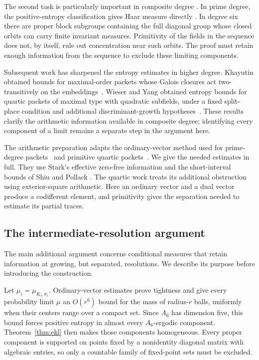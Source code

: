 The second task is particularly important in composite degree
\cite[Section~1.6.3]{ELMV2011}. In prime
degree, the positive-entropy classification gives Haar measure directly
\cite[Corollary~1.4]{EKL2006}. In degree six there are proper block
subgroups containing the full diagonal group whose closed orbits can
carry finite invariant measures. Primitivity of the fields in the
sequence does not, by itself, rule out concentration near such orbits.
The proof must retain enough information from the sequence to exclude
these limiting components.

Subsequent work has sharpened the entropy estimates in higher degree.
Khayutin obtained bounds for maximal-order packets whose Galois closures
act two-transitively on the embeddings~\cite[Theorem~1.1]{Khayutin2019}.
Wieser and Yang obtained entropy bounds for quartic packets of maximal
type with quadratic subfields, under a fixed split-place condition and
additional discriminant-growth hypotheses~\cite{WieserYang2026}.
These results clarify the arithmetic information available in composite
degree; identifying every component of a limit remains a separate step
in the argument here.

The arithmetic preparation adapts the ordinary-vector method used for
prime-degree packets~\cite[Sections~2--6]{PrimeDegreePackets} and primitive
quartic packets~\cite[Section~3]{QuarticPackets}. We give the needed estimates in full.
They use Stark's effective zero-free information
\cite{Stark1974} and the short-interval bounds of Shiu and Pollack
\cite{Shiu1980,Pollack2020}. The quartic work treats its additional
obstruction using exterior-square arithmetic. Here an ordinary vector
and a dual vector produce a codifferent element, and primitivity gives
the separation needed to estimate its partial traces.

\subsection{The intermediate-resolution argument}

The main additional argument concerns conditional measures that retain
information at growing, but separated, resolutions. We describe its
purpose before introducing the construction.

Let $\mu_i=\mu_{K_i,\sigma_i}$. Ordinary-vector estimates prove
tightness and give every probability limit $\mu$ an $O(r^6)$ bound
for the mass of radius-$r$ balls, uniformly when their centers range
over a compact set. Since $A_6$ has dimension five, this bound
forces positive entropy in almost every $A_6$-ergodic component.
Theorem~\ref{thm:ekl} then makes those components homogeneous.
Every proper component is supported on points fixed by a nonidentity
diagonal matrix with algebraic entries, so only a countable family of
fixed-point sets must be excluded.

